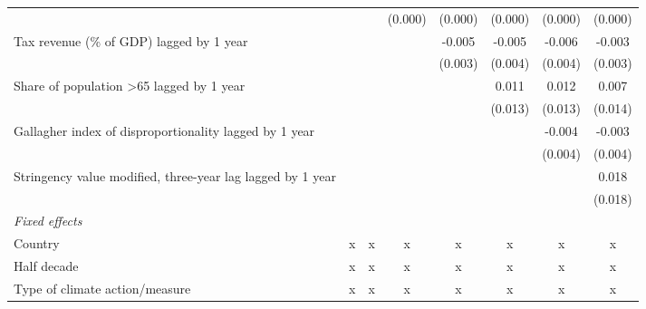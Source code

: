 \begin{tabular}{lccccccc}
                                                                                  &              &              & (0.000)      & (0.000)     & (0.000)     & (0.000)      & (0.000)\\   
   Tax revenue (\% of GDP) lagged by 1 year                                       &              &              &              & -0.005      & -0.005      & -0.006       & -0.003\\   
                                                                                  &              &              &              & (0.003)     & (0.004)     & (0.004)      & (0.003)\\   
   Share of population >65 lagged by 1 year                                       &              &              &              &             & 0.011       & 0.012        & 0.007\\   
                                                                                  &              &              &              &             & (0.013)     & (0.013)      & (0.014)\\   
   Gallagher index of disproportionality lagged by 1 year                         &              &              &              &             &             & -0.004       & -0.003\\   
                                                                                  &              &              &              &             &             & (0.004)      & (0.004)\\   
   Stringency value modified, three-year lag lagged by 1 year                     &              &              &              &             &             &              & 0.018\\   
                                                                                  &              &              &              &             &             &              & (0.018)\\   
   \emph{Fixed effects}\\
   Country                                                                        & x            & x            & x            & x           & x           & x            & x\\  
   Half decade                                                                    & x            & x            & x            & x           & x           & x            & x\\  
   Type of climate action/measure                                                 & x            & x            & x            & x           & x           & x            & x\\  

\end{tabular}
